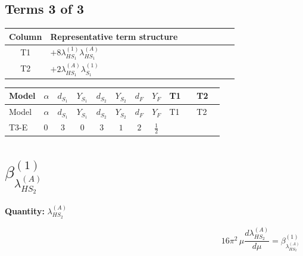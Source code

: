 \documentclass[8pt]{article}
\begin{document}
\begin{landscape}
\subsection*{Terms 3 of 3}
\begin{center}
\begin{tabular}{@{}c >{\raggedright\arraybackslash}p{0.82\linewidth}@{}}
\toprule
Column & Representative term structure \\
\midrule
T1 & \(\displaystyle +8 {\lambda_{HS_1}^{(1)}} {\lambda_{HS_1}^{(A)}}\) \\
\midrule
T2 & \(\displaystyle +2 {\lambda_{HS_1}^{(A)}} {\lambda_{S_1}^{(1)}}\) \\
\midrule
\bottomrule
\end{tabular}
\end{center}
\smallskip
\tiny
\begin{longtable}{@{}llcccccc >{\raggedright\arraybackslash}p{0.21\linewidth} >{\raggedright\arraybackslash}p{0.21\linewidth}@{}}
\toprule
Model & $\alpha$ & $d_{S_1}$ & $Y_{S_1}$ & $d_{S_2}$ & $Y_{S_2}$ & $d_F$ & $Y_F$ & T1 & T2 \\
\midrule
\endfirsthead
\toprule
Model & $\alpha$ & $d_{S_1}$ & $Y_{S_1}$ & $d_{S_2}$ & $Y_{S_2}$ & $d_F$ & $Y_F$ & T1 & T2 \\
\midrule
\endhead
T3-E & $0$ & $3$ & $0$ & $3$ & $1$ & $2$ & $\frac{1}{2}$ & \scriptsize\adjustbox{max width=\linewidth}{$\begin{gathered} +8 {\lambda_{HS_1}^{(1)}} {\lambda_{HS_1}^{(A)}}\end{gathered}$} & \scriptsize\adjustbox{max width=\linewidth}{$\begin{gathered} +2 {\lambda_{HS_1}^{(A)}} {\lambda_{S_1}^{(1)}}\end{gathered}$} \\
\midrule
\bottomrule
\end{longtable}
\clearpage
\section*{$\beta_{\lambda_{HS_2}^{(A)}}^{(1)}$}
\noindent\textbf{Quantity: }$\lambda_{HS_2}^{(A)}$\par\smallskip
\[16\pi^2\,\mu\frac{d \lambda_{HS_2}^{(A)}}{d\mu}=\beta_{\lambda_{HS_2}^{(A)}}^{(1)}\]

\end{landscape}
\end{document}
